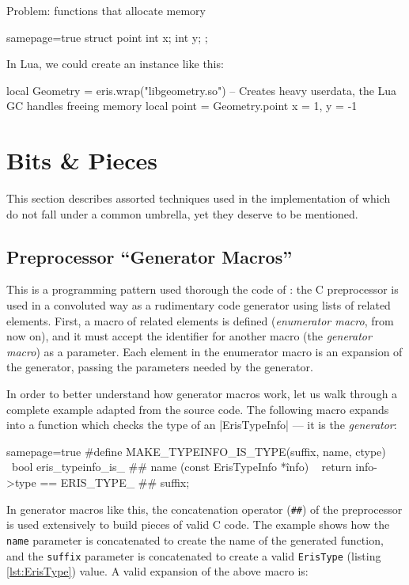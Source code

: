Problem: functions that allocate memory

\begin{ccode*}{samepage=true}
struct point {
	int x;
	int y;
};
\end{ccode*}

In Lua, we could create an instance like this:

\begin{luacode}
local Geometry = eris.wrap("libgeometry.so")
-- Creates heavy userdata, the Lua GC handles freeing memory
local point = Geometry.point { x = 1, y = -1 }
\end{luacode}


\section{Bits \& Pieces}

This section describes assorted techniques used in the implementation of
\Eris* which do not fall under a common umbrella, yet they deserve to be
mentioned.

\subsection{Preprocessor “Generator Macros”}
  \label{sec:cpp-abuse-genmacros}

This is a programming pattern used thorough the code of \Eris*: the
C preprocessor is used in a convoluted way as a rudimentary code generator
using lists of related elements. First, a macro of related elements is defined
(\emph{enumerator macro}, from now on), and it must accept the identifier for
another macro (the \emph{generator macro}) as a parameter. Each element in the
enumerator macro is an expansion of the generator, passing the parameters
needed by the generator.

In order to better understand how generator macros work, let us walk through
a complete example adapted from the \Eris* source code. The following macro
expands into a function which checks the type of an \Mc|ErisTypeInfo| — it is
the \emph{generator}:

\begin{ccode*}{samepage=true}
#define MAKE_TYPEINFO_IS_TYPE(suffix, name, ctype)            \
    bool eris_typeinfo_is_ ## name (const ErisTypeInfo *înfo) \
    { return info->type == ERIS_TYPE_ ## suffix; }
\end{ccode*}

\noindent In generator macros like this, the concatenation operator
(\verb|##|) of the preprocessor is used extensively to build pieces of valid
C code. The example shows how the \verb|name| parameter is concatenated to
create the name of the generated function, and the \verb|suffix| parameter is
concatenated to create a valid \verb|ErisType| (listing \vref{lst:ErisType})
value. A valid expansion of the above macro is:

